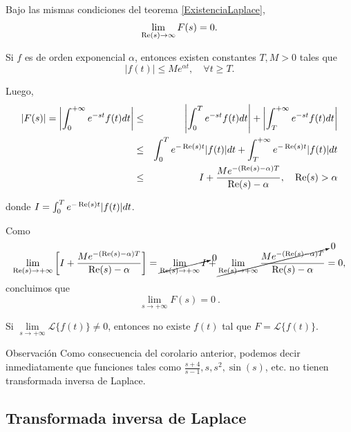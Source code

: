\begin{propo} \label{T.LaplaceLim}
Bajo las mismas condiciones del teorema \ref{ExistenciaLaplace},
$$\lim_{\operatorname{Re}(s) \to \infty} F(s) = 0.$$
\end{propo}

\begin{demo}
    Si $f$ es de orden exponencial $\alpha$, entonces existen constantes  $T, M >0$ tales que
\begin{equation*}
|f(t)| \leq M e^{\alpha t}, \quad \forall t \geq T.
\end{equation*}

Luego,
\begin{eqnarray*}
\left|F(s)\right| = \left| \int_0^{+\infty} e^{-st} f(t) dt \right| &\leq &\left| \int_0^{T} e^{-st} f(t) dt \right| + \left| \int_T^{+\infty} e^{-st} f(t) dt \right| \\
& \leq & \int_0^T e^{-\operatorname{Re}(s)t} |f(t)| dt +  \int_T^{+\infty} e^{-\operatorname{Re}(s)t} |f(t)| dt \\
& \leq & I + \frac{M e^{-(\operatorname{Re}(s)-\alpha)T}}{\operatorname{Re}(s)-\alpha}, \quad \operatorname{Re}(s) > \alpha
\end{eqnarray*}

donde $I = \int_0^T e^{-\operatorname{Re}(s)t} |f(t)| dt$.

Como 
\begin{equation*}
\lim_{\operatorname{Re}(s) \to +\infty} \left[ I + \frac{M e^{-(\operatorname{Re}(s)-\alpha)T}}{\operatorname{Re}(s) -\alpha} \right] = \cancelto{0}{\lim_{\operatorname{Re}(s) \to +\infty} I} +  \cancelto{0}{\lim_{\operatorname{Re}(s) \to +\infty} \frac{M e^{-(\operatorname{Re}(s)-\alpha)T}}{\operatorname{Re}(s) -\alpha}} = 0,
\end{equation*}
concluimos que
$$\lim_{s \to + \infty} F(s) = 0 \ .$$
\end{demo}

\begin{corolario}
    Si $\lim\limits_{s \to + \infty} \mathcal{L}\{f(t)\} \neq 0$, entonces no existe $f(t)$ tal que $F = \mathcal{L}\{f(t)\}$.
\end{corolario}

\begin{obs}{Observación}
    Como consecuencia del corolario anterior, podemos decir inmediatamente que funciones tales como $\frac{s+4}{s-1}, s, s^2, \sin(s)$, etc. no tienen transformada inversa de Laplace.
\end{obs}



\subsection{Transformada inversa de Laplace}

